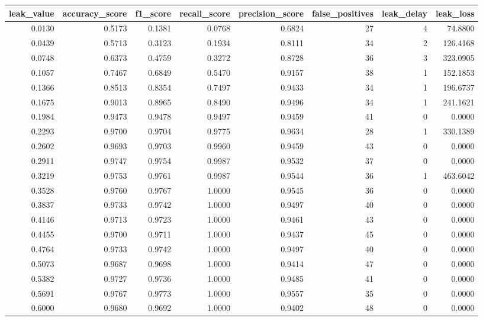 \begin{tabular}{rrrrrrrr}
\toprule
leak\_value & accuracy\_score & f1\_score & recall\_score & precision\_score & false\_positives & leak\_delay & leak\_loss \\
\midrule
0.0130 & 0.5173 & 0.1381 & 0.0768 & 0.6824 & 27 & 4 & 74.8800 \\
0.0439 & 0.5713 & 0.3123 & 0.1934 & 0.8111 & 34 & 2 & 126.4168 \\
0.0748 & 0.6373 & 0.4759 & 0.3272 & 0.8728 & 36 & 3 & 323.0905 \\
0.1057 & 0.7467 & 0.6849 & 0.5470 & 0.9157 & 38 & 1 & 152.1853 \\
0.1366 & 0.8513 & 0.8354 & 0.7497 & 0.9433 & 34 & 1 & 196.6737 \\
0.1675 & 0.9013 & 0.8965 & 0.8490 & 0.9496 & 34 & 1 & 241.1621 \\
0.1984 & 0.9473 & 0.9478 & 0.9497 & 0.9459 & 41 & 0 & 0.0000 \\
0.2293 & 0.9700 & 0.9704 & 0.9775 & 0.9634 & 28 & 1 & 330.1389 \\
0.2602 & 0.9693 & 0.9703 & 0.9960 & 0.9459 & 43 & 0 & 0.0000 \\
0.2911 & 0.9747 & 0.9754 & 0.9987 & 0.9532 & 37 & 0 & 0.0000 \\
0.3219 & 0.9753 & 0.9761 & 0.9987 & 0.9544 & 36 & 1 & 463.6042 \\
0.3528 & 0.9760 & 0.9767 & 1.0000 & 0.9545 & 36 & 0 & 0.0000 \\
0.3837 & 0.9733 & 0.9742 & 1.0000 & 0.9497 & 40 & 0 & 0.0000 \\
0.4146 & 0.9713 & 0.9723 & 1.0000 & 0.9461 & 43 & 0 & 0.0000 \\
0.4455 & 0.9700 & 0.9711 & 1.0000 & 0.9437 & 45 & 0 & 0.0000 \\
0.4764 & 0.9733 & 0.9742 & 1.0000 & 0.9497 & 40 & 0 & 0.0000 \\
0.5073 & 0.9687 & 0.9698 & 1.0000 & 0.9414 & 47 & 0 & 0.0000 \\
0.5382 & 0.9727 & 0.9736 & 1.0000 & 0.9485 & 41 & 0 & 0.0000 \\
0.5691 & 0.9767 & 0.9773 & 1.0000 & 0.9557 & 35 & 0 & 0.0000 \\
0.6000 & 0.9680 & 0.9692 & 1.0000 & 0.9402 & 48 & 0 & 0.0000 \\
\bottomrule
\end{tabular}

